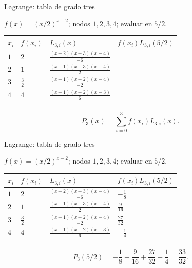 \documentclass[main.tex]{subfiles}
\begin{document}
\begin{frame}[t]{Lagrange: tabla de grado tres}
\par\noindent\begin{minipage}[t][12mm][t]{\textwidth}\small\strut $f(x)=(x/2)^{x-2}$; nodos $1,2,3,4$; evaluar en $5/2$.\end{minipage}\par\nointerlineskip
\begingroup\scriptsize\setlength{\tabcolsep}{3pt}\begin{center}\begin{tabular}{|C{.06\textwidth}|C{.10\textwidth}|C{.48\textwidth}|C{.20\textwidth}|}\hline
\rule[-2mm]{0pt}{6mm}$x_i$&$f(x_i)$&$L_{3,i}(x)$&$f(x_i)L_{3,i}(5/2)$\\\hline
\rule[-2.5mm]{0pt}{7mm}$1$&$2$&$\frac{(x-2)(x-3)(x-4)}{-6}$&\\\hline
\rule[-2.5mm]{0pt}{7mm}$2$&$1$&$\frac{(x-1)(x-3)(x-4)}{2}$&\\\hline
\rule[-2.5mm]{0pt}{7mm}$3$&$\frac{3}{2}$&$\frac{(x-1)(x-2)(x-4)}{-2}$&\\\hline
\rule[-2.5mm]{0pt}{7mm}$4$&$4$&$\frac{(x-1)(x-2)(x-3)}{6}$&\\\hline
\rule[-2.5mm]{0pt}{7mm}&&&\\\hline
\end{tabular}\end{center}\endgroup\par
\[P_3(x)=\sum_{i=0}^3 f(x_i)L_{3,i}(x).\]
\end{frame}
\begin{frame}[t]{Lagrange: tabla de grado tres}
\par\noindent\begin{minipage}[t][12mm][t]{\textwidth}\small\strut $f(x)=(x/2)^{x-2}$; nodos $1,2,3,4$; evaluar en $5/2$.\end{minipage}\par\nointerlineskip
\begingroup\scriptsize\setlength{\tabcolsep}{3pt}\begin{center}\begin{tabular}{|C{.06\textwidth}|C{.10\textwidth}|C{.48\textwidth}|C{.20\textwidth}|}\hline
\rule[-2mm]{0pt}{6mm}$x_i$&$f(x_i)$&$L_{3,i}(x)$&$f(x_i)L_{3,i}(5/2)$\\\hline
\rule[-2.5mm]{0pt}{7mm}$1$&$2$&$\frac{(x-2)(x-3)(x-4)}{-6}$&$-\frac{1}{8}$\\\hline
\rule[-2.5mm]{0pt}{7mm}$2$&$1$&$\frac{(x-1)(x-3)(x-4)}{2}$&$\frac{9}{16}$\\\hline
\rule[-2.5mm]{0pt}{7mm}$3$&$\frac{3}{2}$&$\frac{(x-1)(x-2)(x-4)}{-2}$&$\frac{27}{32}$\\\hline
\rule[-2.5mm]{0pt}{7mm}$4$&$4$&$\frac{(x-1)(x-2)(x-3)}{6}$&$-\frac{1}{4}$\\\hline
\rule[-2.5mm]{0pt}{7mm}&&&\\\hline
\end{tabular}\end{center}\endgroup\par
\[P_3(5/2)=-\frac18+\frac9{16}+\frac{27}{32}-\frac14=\frac{33}{32}.\]
\end{frame}
\end{document}

